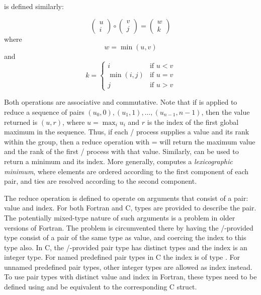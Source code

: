  is defined similarly:

\[
\left( \begin{array}{c} u \\ i \end{array} \right)
\circ
\left( \begin{array}{c} v \\ j \end{array} \right)
=
\left( \begin{array}{c} w \\ k \end{array} \right)
\]
where
\[
w = \min (u,v)
\]
and
\[
k = \left\{ \begin{array}{ll}
    i & \mbox{if $u < v$} \\
    \min(i,j) & \mbox{if $u=v$} \\
    j & \mbox{if $u > v$}
\end{array}
\right.
\]

Both operations are associative and commutative.
Note that if 
is applied to reduce a sequence of pairs
$(u_0, 0), (u_1, 1) , \ldots, (u_{n-1} , n-1)$, then the value
returned is $(u , r)$, where $u = \max_i u_i$ and $r$ is the index of
the first global maximum in the sequence.  Thus, if each \MPI/ process
supplies a value and its rank within the group, then a reduce
operation with  =  will return the
maximum value and the rank of the first \MPI/ process with that value.
Similarly,  can be used to return a minimum and its
index.
More generally,  computes a \emph{lexicographic
minimum}, where elements are ordered according to the first component
of each pair, and ties are resolved according to the second component.

The reduce operation is defined to operate on arguments that
consist of a pair: value and index.
For both Fortran and C, types are provided to describe the pair.
The potentially mixed-type nature of such arguments
is a problem in older versions of Fortran.  The problem is circumvented there by
having the \MPI/-provided type consist of a pair of the same type as
value, and coercing the index to this type also.  In C, the \MPI/-provided
pair type has distinct types and the index is an integer type. For
named predefined pair types in C the index is of type .
For unnamed predefined pair types, other integer types are allowed as
index instead.
To use pair types with distinct value and index in Fortran, these types need to be defined using  and be equivalent to the corresponding C struct.


